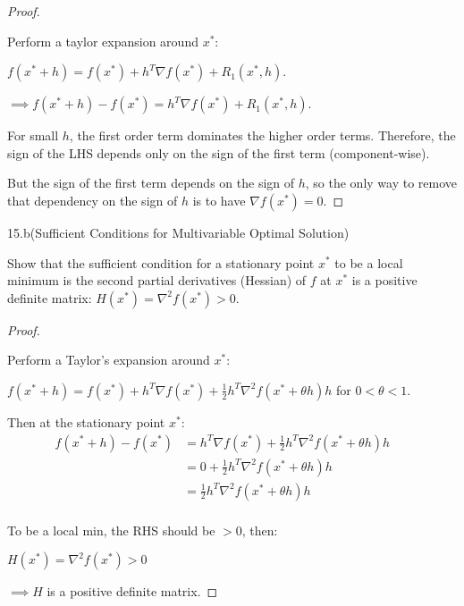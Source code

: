 \documentclass{article}
\begin{document}
\begin{proof}
  $ $

  Perform a taylor expansion around $x^*$:

  $f(x^* + h) = f(x^*) + h^T \nabla f(x^*) + R_1(x^*, h)$.

  \noindent
  $\implies f(x^* + h) - f(x^*) = h^T \nabla f(x^*) + R_1(x^*, h)$.
  \newline

  For small $h$, the first order term dominates the higher order terms. Therefore, the sign of the LHS depends only on the sign of the first term (component-wise).
  \newline

  But the sign of the first term depends on the sign of $h$, so the only way to remove that dependency on the sign of $h$ is to have $\nabla f(x^*) = 0$.

\end{proof}
\newpage

\begin{customthm}{15.b}{(Sufficient Conditions for Multivariable Optimal Solution)}
  $ $

  Show that the sufficient condition for a stationary point $x^*$ to be a local minimum is the second partial derivatives (Hessian) of $f$ at $x^*$ is a positive definite matrix: $H(x^*) = \nabla^2 f(x^*) > 0$.

\end{customthm}

\begin{proof}
  $ $

  Perform a Taylor's expansion around $x^*$:

  \qquad $f(x^* + h) = f(x^*) + h^T \nabla f(x^*) + \frac{1}{2} h^T \nabla^2 f(x^* + \theta h)h$ \quad for $0<\theta<1$.
  \newline

  Then at the stationary point $x^*$:
  \begin{align*}
    f(x^* + h) - f(x^*) &= h^T \nabla f(x^*) + \frac{1}{2} h^T \nabla^2 f(x^* + \theta h)h &&\\ 
    &= 0 + \frac{1}{2} h^T \nabla^2 f(x^* + \theta h)h &&\\
    &= \frac{1}{2} h^T \nabla^2 f(x^* + \theta h)h &&\\
  \end{align*}
  

  To be a local min, the RHS should be $>0$, then:

  \qquad $H(x^*) = \nabla^2 f(x^*)>0$

  \noindent
  $\implies H$ is a positive definite matrix.

\end{proof}
\newpage
\end{document}
